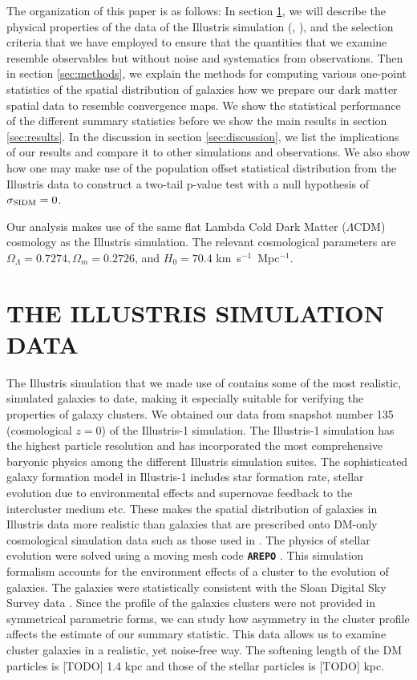 The organization of this paper is as follows:
In section \ref{sec:illustris_sim}, we will describe the physical properties of 
the data of the Illustris
simulation (\citealt{Vogelsberger2014}, \citealt{Genel2014a}), 
and the selection criteria that we have employed to ensure that the
quantities that we examine resemble observables but without noise and
systematics from observations. 
Then in section \ref{sec:methods}, 
we explain the methods for computing various 
one-point statistics of the spatial distribution of galaxies how we prepare our dark
matter spatial data to resemble convergence maps. We show the statistical performance
of the different summary statistics before we show the main results
in section \ref{sec:results}. In the discussion in section \ref{sec:discussion}, 
we list the implications of our
results and compare it to other simulations and observations. We also 
show how one may make use of the population offset statistical distribution
from the Illustris data to construct a two-tail p-value test with 
a null hypothesis of $\sigma_{\rm SIDM} = 0$. 

	Our analysis makes use of the same flat Lambda Cold Dark Matter ($\Lambda$CDM) cosmology
as the Illustris simulation. The relevant cosmological parameters are
$\Omega_\Lambda = 0.7274, \Omega_m = 0.2726$, and $H_0 = 70.4$
km~s$^{-1}$~Mpc$^{-1}$.

\section{THE ILLUSTRIS SIMULATION DATA} 
\label{sec:illustris_sim}
The Illustris simulation that we made use of contains some of the most
realistic, simulated galaxies to date, making it especially suitable for 
verifying the properties of galaxy clusters. We obtained our data from 
snapshot number 135 (cosmological $z=0$) of the Illustris-1 simulation. The Illustris-1
simulation has the highest particle resolution and has incorporated the most 
comprehensive baryonic physics among the different Illustris simulation suites. 
The sophisticated galaxy formation model in Illustris-1 
includes star formation rate, stellar evolution due to
environmental effects and supernovae feedback to the intercluster medium etc. 
These makes the spatial distribution of galaxies in  Illustris data more 
realistic than galaxies that are prescribed onto DM-only cosmological
simulation data such as those used in \cite{Harvey2013d}.  The physics of stellar
evolution were solved using a moving mesh code {\bf \texttt{AREPO}} \citep{Springel2010}.
This simulation formalism accounts for the environment effects of a cluster to the
evolution of galaxies. The galaxies were statistically consistent
with the Sloan Digital Sky Survey data
\citep{Vogelsberger2014}. Since the profile of the galaxies clusters were not
provided in symmetrical parametric forms, we can study 
how asymmetry in the cluster profile affects the estimate of our summary 
statistic. This data allows us to examine cluster galaxies
in a realistic, yet noise-free way. The softening length of the DM particles is
[TODO] 1.4 kpc and those of the stellar particles is [TODO] kpc.

